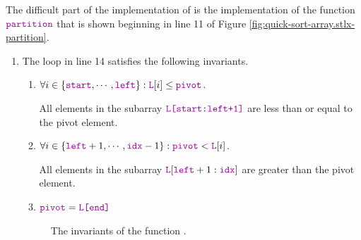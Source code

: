 \noindent
The difficult part of the implementation of  is the implementation of the
function $\mytt{partition}$ that is shown beginning in line 11 of Figure \ref{fig:quick-sort-array.stlx-partition}.
\begin{enumerate}
\item
      The  loop in line 14 satisfies the following invariants.
      \begin{enumerate}
      \item $\forall i \in \{ \mytt{start}, \cdots, \mytt{left} \} : \mytt{L}[i] \leq \mytt{pivot}$.

            All elements in the subarray $\mytt{L[start:left+1]}$ are less than or equal to the pivot element.
      \item $\forall i \in \{ \mytt{left}+1,\cdots,\mytt{idx}-1\}:\mytt{pivot} < \mytt{L}[i]$.

            All elements in the subarray $\mytt{L}[\mytt{left}+1:\mytt{idx}]$ are greater than the pivot
            element.
      \item $\mytt{pivot} = \mytt{L[end]}$
      \end{enumerate}

\begin{figure}[!ht]
  \centering
  \caption{The invariants of the function .}
  \label{fig:lomuto.png}
\end{figure}



\end{enumerate}

